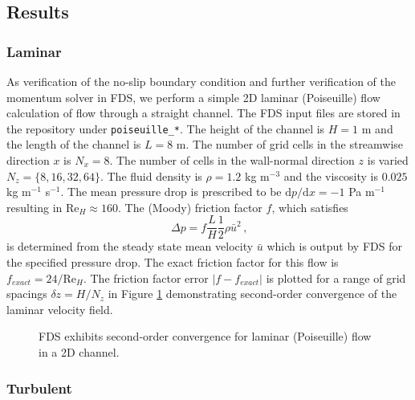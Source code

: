 \documentclass[11pt]{book}
\begin{document}
\subsection{Results}
\label{results}

\subsubsection{Laminar}
\label{laminar}

As verification of the no-slip boundary condition and further verification of the momentum solver in FDS, we perform a simple 2D laminar (Poiseuille) flow calculation of flow through a straight channel.  The FDS input files are stored in the repository \cite{FDS-SMV_repository} under {\tt poiseuille\_*}. The height of the channel is $H=1$ m and the length of the channel is $L=8$ m.  The number of grid cells in the streamwise direction $x$ is $N_x = 8$.  The number of cells in the wall-normal direction $z$ is varied $N_z = \{8,16,32,64\}$.  The fluid density is $\rho = 1.2$ kg m$^{-3}$ and the viscosity is $0.025$ kg m$^{-1}$ s$^{-1}$.  The mean pressure drop is prescribed to be $\mbox{d}p/\mbox{d}x = -1$ Pa m$^{-1}$ resulting in Re$_H \approx 160$.  The (Moody) friction factor $f$, which satisfies
\begin{equation}
\label{eqn_moodyf}
\Delta p = f \frac{L}{H} \frac{1}{2} \rho \bar{u}^2 \,\mbox{,}
\end{equation}
is determined from the steady state mean velocity $\bar{u}$ which is output by FDS for the specified pressure drop.  The exact friction factor for this flow is $f_{exact} = 24/\mbox{Re}_H$.  The friction factor error $|f-f_{exact}|$ is plotted for a range of grid spacings $\delta z = H/N_z$ in Figure \ref{fig_poiseuille_convergence} demonstrating second-order convergence of the laminar velocity field.
\begin{figure}
   \begin{center}
      \caption{\label{fig_poiseuille_convergence} \small FDS exhibits second-order convergence for laminar (Poiseuille) flow in a 2D channel.}
   \end{center}
\end{figure}


\subsubsection{Turbulent}
\label{turbulent}
\end{document}
